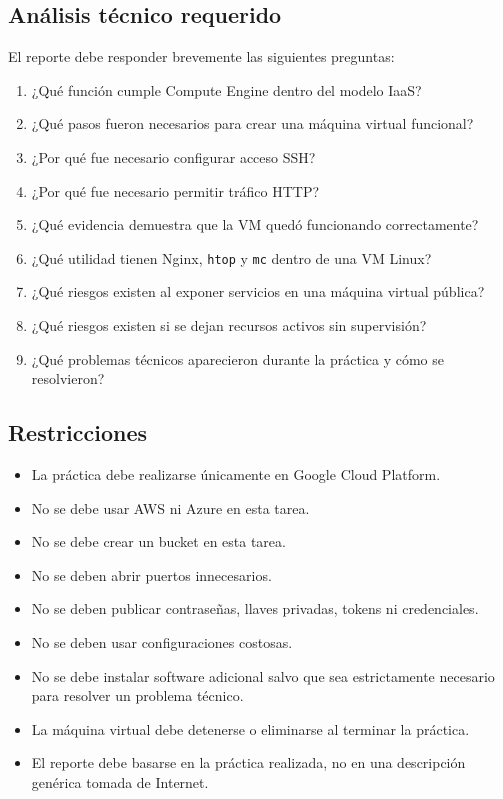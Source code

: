 \documentclass[
  coursetitle={Cómputo Nube y Tecnologías Emergentes},
  coursehours={96},
  coursedate={Verano 2026},
  doctype={Tarea 2},
  otherlangs={english,french},
  authorname={Lázaro},
  authorsurname={Bustio-Martínez},
  authortitle={PhD},
  role={Profesor Investigador},
  email={lbustio@inaoe.mx},
  phone={5559504000},
  ext={7459},
  institution={Instituto Nacional de Astrofísica, Óptica y Electrónica (INAOE)},
  department={Maestría en Ciencias en Tecnologías de Seguridad},
  address={Luis Enrique Erro 1, Sta. Ma. Tonantzintla, San Andrés Cholula, CP 72840, Puebla, México},
  margin={0.5in}
]{lbustio_lecture_notes}
\begin{document}
\subsection{Análisis técnico requerido}
\label{sec:tarea2-analisis}

El reporte debe responder brevemente las siguientes preguntas:

\begin{enumerate}
  \item ¿Qué función cumple Compute Engine dentro del modelo IaaS?
  \item ¿Qué pasos fueron necesarios para crear una máquina virtual funcional?
  \item ¿Por qué fue necesario configurar acceso SSH?
  \item ¿Por qué fue necesario permitir tráfico HTTP?
  \item ¿Qué evidencia demuestra que la VM quedó funcionando correctamente?
  \item ¿Qué utilidad tienen Nginx, \texttt{htop} y \texttt{mc} dentro de una VM Linux?
  \item ¿Qué riesgos existen al exponer servicios en una máquina virtual pública?
  \item ¿Qué riesgos existen si se dejan recursos activos sin supervisión?
  \item ¿Qué problemas técnicos aparecieron durante la práctica y cómo se resolvieron?
\end{enumerate}

\subsection{Restricciones}
\label{sec:tarea2-restricciones}

\begin{itemize}
  \item La práctica debe realizarse únicamente en Google Cloud Platform.
  \item No se debe usar AWS ni Azure en esta tarea.
  \item No se debe crear un bucket en esta tarea.
  \item No se deben abrir puertos innecesarios.
  \item No se deben publicar contraseñas, llaves privadas, tokens ni credenciales.
  \item No se deben usar configuraciones costosas.
  \item No se debe instalar software adicional salvo que sea estrictamente necesario para resolver un problema técnico.
  \item La máquina virtual debe detenerse o eliminarse al terminar la práctica.
  \item El reporte debe basarse en la práctica realizada, no en una descripción genérica tomada de Internet.
\end{itemize}
\end{document}
